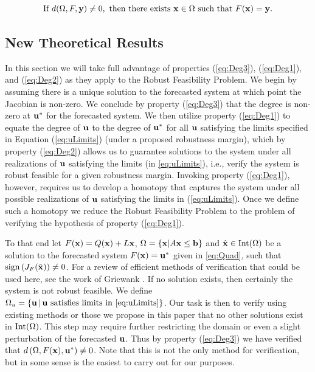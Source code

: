 \begin{equation}\label{eq:Deg2}
\text{If }d(\Omega,F,\mathbf{y})\neq 0,\text{ then there exists }\mathbf{x}\in\Omega\text{ such that }F(\mathbf{x})=\mathbf{y}. 
\end{equation}

\subsection{New Theoretical Results}
In this section we will take full advantage of properties (\ref{eq:Deg3}), (\ref{eq:Deg1}), and (\ref{eq:Deg2}) as they apply to the Robust Feasibility Problem.
We begin by assuming there is a unique solution to the forecasted system at which point the Jacobian is non-zero.
We conclude by property (\ref{eq:Deg3}) that the degree is non-zero at $\mathbf{u}^*$ for the forecasted system. 
We then utilize property (\ref{eq:Deg1}) to equate the degree of $\mathbf{u}$ to the degree of $\mathbf{u}^*$ for all $\mathbf{u}$ satisfying the limits specified in Equation (\ref{eq:uLimits}) (under a proposed robustness margin), which by property (\ref{eq:Deg2}) allows us to guarantee solutions to the system under all realizations of $\mathbf{u}$ satisfying the limits (in \ref{eq:uLimits}), i.e., verify the system is robust feasible for a given robustness margin.
Invoking property (\ref{eq:Deg1}), however, requires us to develop a homotopy that captures the system under all possible realizations of $\mathbf{u}$ satisfying the limits in (\ref{eq:uLimits}).
Once we define such a homotopy we reduce the Robust Feasibility Problem to the problem of verifying the hypothesis of property (\ref{eq:Deg1}). 

\medskip
To that end let $F(\mathbf{x})=Q(\mathbf{x})+L\mathbf{x}$, $\Omega=\{\mathbf{x}| A\mathbf{x} \leq \mathbf{b}\}$ and $\hat{\mathbf{x}}\in \operatorname{Int}(\Omega)$ be a solution to the forecasted system $F(\mathbf{x})=\mathbf{u}^*$ given in \cref{eq:Quad}, such that $\operatorname{sign}\left(J_{F}(\hat{\mathbf{x}})\right) \neq 0$.
For a review of efficient methods of verification that could be used here, see the work of Griewank \cite{GRIEWANK2014}. 
If no solution exists, then certainly the system is not robust feasible.
We define $\Omega_u=\{\vu \,|\,\vu \text{ satisfies limits in \cref{eq:uLimits}}\}$.
Our task is then to verify using existing methods or those we propose in this paper that no other solutions exist in $\operatorname{Int}(\Omega)$.
This step may require further restricting the domain or even a slight perturbation of the forecasted $\mathbf{u}$. 
Thus by property (\ref{eq:Deg3}) we have verified that $d\left(\Omega, F(\mathbf{x}), \mathbf{u}^*\right)\neq 0$. 
Note that this is not the only method for verification, but in some sense is the easiest to carry out for our purposes. 

